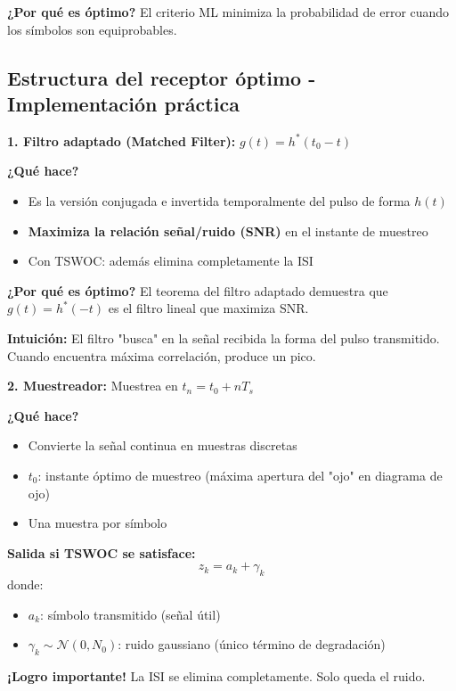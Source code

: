 \documentclass[10pt,a4paper]{article}
\begin{document}
\textbf{¿Por qué es óptimo?} El criterio ML minimiza la probabilidad de error cuando los símbolos son equiprobables.

\subsection{Estructura del receptor óptimo - Implementación práctica}

\begin{tcolorbox}[colback=azulclaro!10,colframe=azuloscuro,title=Receptor ML: Tres bloques fundamentales]
\textbf{1. Filtro adaptado (Matched Filter):} $g(t) = h^*(t_0 - t)$

\textbf{¿Qué hace?}
\begin{itemize}
\item Es la versión conjugada e invertida temporalmente del pulso de forma $h(t)$
\item \textbf{Maximiza la relación señal/ruido (SNR)} en el instante de muestreo
\item Con TSWOC: además elimina completamente la ISI
\end{itemize}

\textbf{¿Por qué es óptimo?} El teorema del filtro adaptado demuestra que $g(t) = h^*(-t)$ es el filtro lineal que maximiza SNR.

\textbf{Intuición:} El filtro "busca" en la señal recibida la forma del pulso transmitido. Cuando encuentra máxima correlación, produce un pico.

\textbf{2. Muestreador:} Muestrea en $t_n = t_0 + nT_s$

\textbf{¿Qué hace?}
\begin{itemize}
\item Convierte la señal continua en muestras discretas
\item $t_0$: instante óptimo de muestreo (máxima apertura del "ojo" en diagrama de ojo)
\item Una muestra por símbolo
\end{itemize}

\textbf{Salida si TSWOC se satisface:}
$$z_k = a_k + \gamma_k$$
donde:
\begin{itemize}
\item $a_k$: símbolo transmitido (señal útil)
\item $\gamma_k \sim \mathcal{N}(0, N_0)$: ruido gaussiano (único término de degradación)
\end{itemize}

\textbf{¡Logro importante!} La ISI se elimina completamente. Solo queda el ruido.


\end{tcolorbox}
\end{document}
